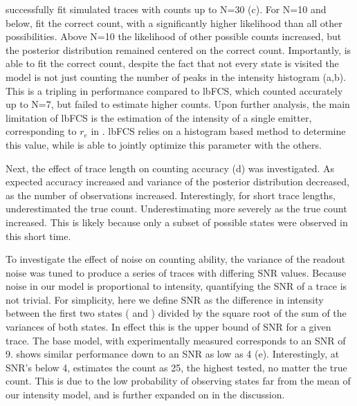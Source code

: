 \ours successfully fit simulated traces with counts up to N=30 (c).
	For N=10 and below, \ours fit the correct count, with a significantly higher likelihood than all other possibilities. 
	Above N=10 the likelihood of other possible counts increased, but the posterior distribution remained centered on the correct count.
	Importantly, \ours is able to fit the correct count,
	despite the fact that not every state is visited \ie the model is not just counting the number of peaks in the intensity histogram (a,b).
	This is a tripling in performance compared to lbFCS, which counted accurately up to N=7, but failed to estimate higher counts.
	Upon further analysis, the main limitation of lbFCS is the estimation of the intensity of a single emitter, corresponding to $r_e$ in \ours. 
	lbFCS relies on a histogram based method to determine this value, while \ours is able to jointly optimize this parameter with the others.

Next, the effect of trace length on counting accuracy (d) was investigated.
	As expected accuracy increased and variance of the posterior distribution decreased, 
	as the number of observations increased.
	Interestingly, for short trace lengths, \ours underestimated the true count. 
	Underestimating more severely as the true count increased.
	This is likely because only a subset of possible states were observed in this short time.

To investigate the effect of noise on counting ability, the variance of the readout noise \camvar was tuned to produce a 
	series of traces with differing SNR values. 
	Because noise in our model is proportional to intensity, quantifying the SNR of a trace 
	is not trivial. 
	For simplicity, here we define SNR as the difference in intensity between 
	the first two states ( and ) divided by the square root of the sum of the variances of both states. 
	In effect this is the upper bound of SNR for a given trace. 
	The base model, with experimentally measured \camvar corresponds to an SNR of 9. 
	\ours shows similar performance down to an SNR as low as 4 (e). 
	Interestingly, at SNR's below 4, \ours estimates the count as 25, the highest \n tested, no matter the true count. 
	This is due to the low probability of observing states far from the mean of our intensity model, and is further expanded on in the discussion. 


